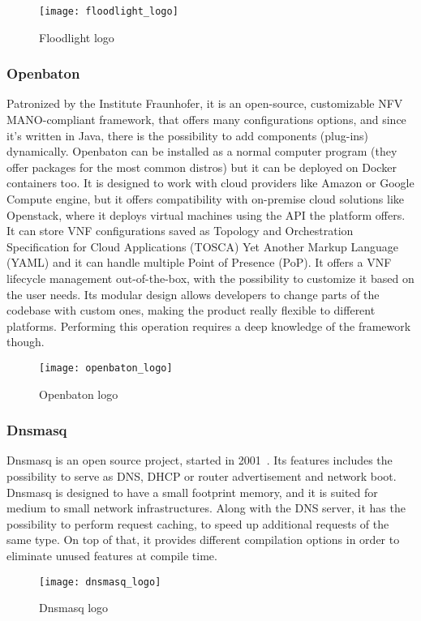 \begin{figure}[h]
  \centering
  \texttt{[image: floodlight\_logo]}
  \caption[Floodlight logo]{Floodlight logo}
\end{figure}

\subsubsection{Openbaton}
\label{chap:prjan:sec:tech:sub:other:sub:openbaton}
Patronized by the Institute Fraunhofer, it is an open-source, customizable NFV
MANO-compliant framework, that offers many configurations options, and since
it's written in Java, there is the possibility to add components (plug-ins)
dynamically. Openbaton can be installed as a normal computer program (they offer
packages for the most common distros) but it can be deployed on Docker
containers too. It is designed to work with cloud providers like Amazon or
Google Compute engine, but it offers compatibility with on-premise cloud
solutions like Openstack, where it deploys virtual machines using the API the
platform offers. It can store VNF configurations saved as Topology and
Orchestration Specification for Cloud Applications (TOSCA) Yet Another Markup
Language (YAML) and it can handle multiple Point of Presence (PoP). It offers a
VNF lifecycle management out-of-the-box, with the possibility to customize it
based on the user needs. Its modular design allows developers to change parts of
the codebase with custom ones, making the product really flexible to different
platforms. Performing this operation requires a deep knowledge of the framework
though.

\begin{figure}[h]
 \centering \texttt{[image: openbaton\_logo]}
 \caption{Openbaton logo}
 \label{chap:prjan:img:openbaton_logo}
\end{figure}

\subsubsection{Dnsmasq}
\label{chap:prjan:sec:tech:sub:other:sub:dnsmasq}
Dnsmasq is an open source project, started in 2001~\cite{dnsmasqweb}. Its
features includes the possibility to serve as DNS, DHCP or router advertisement
and network boot. Dnsmasq is designed to have a small footprint memory, and it
is suited for medium to small network infrastructures. Along with the DNS
server, it has the possibility to perform request caching, to speed up
additional requests of the same type. On top of that, it provides different
compilation options in order to eliminate unused features at compile time.

\begin{figure}[h]
  \centering
  \texttt{[image: dnsmasq\_logo]}
  \caption{Dnsmasq logo}
\end{figure}
